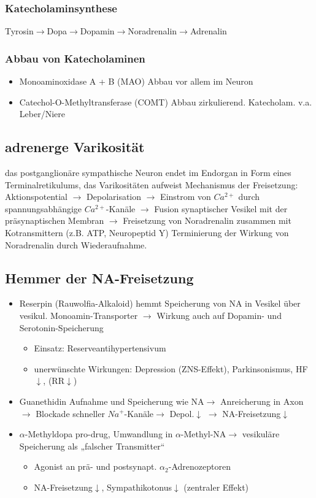\documentclass[10pt,a4paper]{report}
\begin{document}
\subsubsection{Katecholaminsynthese} Tyrosin$\rightarrow$Dopa$\rightarrow$Dopamin$\rightarrow$Noradrenalin$\rightarrow$Adrenalin
\subsubsection{Abbau von Katecholaminen}
\begin{itemize}
	\item Monoaminoxidase A + B (MAO) Abbau vor allem im Neuron
	\item Catechol-O-Methyltransferase (COMT) Abbau zirkulierend. Katecholam. v.a. Leber/Niere
\end{itemize}
\subsection{adrenerge Varikosität}
das postganglionäre sympathische Neuron endet im Endorgan in Form eines Terminalretikulums, das Varikositäten aufweist Mechanismus der Freisetzung: Aktionspotential $\rightarrow$ Depolarisation $\rightarrow$ Einstrom von $Ca^{2+}$ durch spannungsabhängige $Ca^{2+}$-Kanäle $\rightarrow$ Fusion synaptischer Vesikel mit der präsynaptischen Membran $\rightarrow$ Freisetzung von Noradrenalin zusammen mit Kotransmittern (z.B. ATP, Neuropeptid Y) Terminierung der Wirkung von Noradrenalin durch Wiederaufnahme.
\subsection{Hemmer der NA-Freisetzung}
\begin{itemize}
	\item Reserpin (Rauwolfia-Alkaloid) hemmt Speicherung von NA in Vesikel über vesikul. Monoamin-Transporter $\rightarrow$ Wirkung auch auf Dopamin- und Serotonin-Speicherung
	\begin{itemize}
		\item Einsatz: Reserveantihypertensivum
		\item unerwünschte Wirkungen: Depression (ZNS-Effekt), Parkinsonismus, HF$\downarrow$, (RR$\downarrow$)
	\end{itemize}		
	\item Guanethidin Aufnahme und Speicherung wie NA$\rightarrow$ Anreicherung in Axon$\rightarrow$ Blockade schneller $Na^+$-Kanäle$\rightarrow$ Depol.$\downarrow$ $\rightarrow$ NA-Freisetzung$\downarrow$
	\item $\alpha$-Methyldopa pro-drug, Umwandlung in $\alpha$-Methyl-NA$\rightarrow$ vesikuläre Speicherung als „falscher Transmitter“ 
	\begin{itemize}
		\item Agonist an prä- und postsynapt. $\alpha_2$-Adrenozeptoren 
		\item NA-Freisetzung$\downarrow$, Sympathikotonus$\downarrow$ (zentraler Effekt)
	\end{itemize}
\end{itemize}
\end{document}
